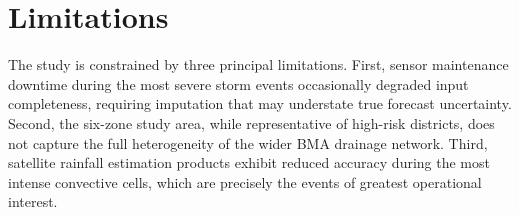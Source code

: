 \section{Limitations}
The study is constrained by three principal limitations. First, sensor maintenance downtime during the most severe storm events occasionally degraded input completeness, requiring imputation that may understate true forecast uncertainty. Second, the six-zone study area, while representative of high-risk districts, does not capture the full heterogeneity of the wider BMA drainage network. Third, satellite rainfall estimation products exhibit reduced accuracy during the most intense convective cells, which are precisely the events of greatest operational interest.
